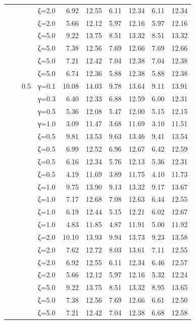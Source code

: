 \begin{table}[htbp]
\begin{tabular}{ll r l  rr  rr  rr}
  &  &  & ζ=2.0 & 6.92 & 12.55 & 6.11 & 12.34 & 6.11 & 12.34 \\
  &  &  & ζ=2.0 & 5.66 & 12.12 & 5.97 & 12.16 & 5.97 & 12.16 \\
  &  &  & ζ=5.0 & 9.22 & 13.75 & 8.51 & 13.32 & 8.51 & 13.32 \\
  &  &  & ζ=5.0 & 7.38 & 12.56 & 7.69 & 12.66 & 7.69 & 12.66 \\
  &  &  & ζ=5.0 & 7.21 & 12.42 & 7.04 & 12.38 & 7.04 & 12.38 \\
  &  &  & ζ=5.0 & 6.74 & 12.36 & 5.88 & 12.38 & 5.88 & 12.38 \\
  &  & 0.5 & γ=0.1 & 10.08 & 14.03 & 9.78 & 13.64 & 9.11 & 13.91 \\
  &  &  & γ=0.3 & 6.40 & 12.33 & 6.88 & 12.59 & 6.00 & 12.31 \\
  &  &  & γ=0.5 & 5.36 & 12.08 & 5.47 & 12.00 & 5.15 & 12.15 \\
  &  &  & γ=1.0 & 3.09 & 11.47 & 3.68 & 11.69 & 3.10 & 11.51 \\
  &  &  & ζ=0.5 & 9.81 & 13.53 & 9.63 & 13.46 & 9.41 & 13.54 \\
  &  &  & ζ=0.5 & 6.99 & 12.52 & 6.96 & 12.67 & 6.42 & 12.59 \\
  &  &  & ζ=0.5 & 6.16 & 12.34 & 5.76 & 12.13 & 5.36 & 12.31 \\
  &  &  & ζ=0.5 & 4.19 & 11.69 & 3.89 & 11.75 & 4.10 & 11.73 \\
  &  &  & ζ=1.0 & 9.75 & 13.90 & 9.13 & 13.32 & 9.17 & 13.67 \\
  &  &  & ζ=1.0 & 7.17 & 12.68 & 7.08 & 12.63 & 6.44 & 12.55 \\
  &  &  & ζ=1.0 & 6.19 & 12.44 & 5.15 & 12.21 & 6.02 & 12.67 \\
  &  &  & ζ=1.0 & 4.83 & 11.85 & 4.87 & 11.91 & 5.00 & 11.92 \\
  &  &  & ζ=2.0 & 10.10 & 13.93 & 9.94 & 13.73 & 9.23 & 13.58 \\
  &  &  & ζ=2.0 & 7.62 & 12.72 & 8.03 & 13.61 & 7.11 & 12.55 \\
  &  &  & ζ=2.0 & 6.92 & 12.55 & 6.11 & 12.34 & 6.46 & 12.57 \\
  &  &  & ζ=2.0 & 5.66 & 12.12 & 5.97 & 12.16 & 5.32 & 12.24 \\
  &  &  & ζ=5.0 & 9.22 & 13.75 & 8.51 & 13.32 & 8.95 & 13.65 \\
  &  &  & ζ=5.0 & 7.38 & 12.56 & 7.69 & 12.66 & 6.61 & 12.50 \\
  &  &  & ζ=5.0 & 7.21 & 12.42 & 7.04 & 12.38 & 6.68 & 12.58 \\

\end{tabular}
\end{table}
